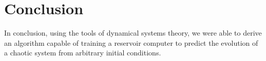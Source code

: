\documentclass[journal]{journal}
\begin{document}
%
%


%






\section{Conclusion}
In conclusion, using the tools of dynamical systems theory, we were able to derive an algorithm capable of training a reservoir computer to predict the evolution of a chaotic system from arbitrary initial conditions.




\end{document}
